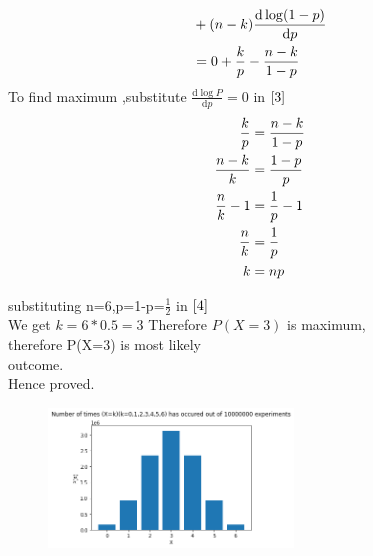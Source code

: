 \documentclass{assignment}
\begin{document}
\begin{paracol}{2}
\begin{large}
\begin{align}
     &+(n-k) \frac{\mathrm{d}\log (1-p)}{\mathrm{d} p} \notag \\
     &=0+\frac{k}{p}-\frac{n-k}{1-p} \label{3}
\end{align}
To find maximum ,substitute $\frac{\mathrm{d} \log P}{\mathrm{d} p}=0$ in $\eqref{3}$
\begin{align}
\frac{k}{p}&=\frac{n-k}{1-p} \notag \\
\frac{n-k}{k}&=\frac{1-p}{p} \notag \\
\frac{n}{k}-1&=\frac{1}{p}-1 \notag \\
\frac{n}{k}&=\frac{1}{p} \notag \\
k&=np \label{4}
\end{align}
\end{large}
\begin{Large}
\switchcolumn[0]
substituting n=6,p=1-p=$\frac{1}{2}$ in $\eqref{4}$\\
We get $k=6*0.5=3$
Therefore $P(X=3)$ is maximum,\\
therefore P(X=3) is most likely \\
outcome.\\
Hence proved.
\switchcolumn[1]
\begin{figure}
\begin{center}
\includegraphics[width=0.58\textwidth]{assignment1.png}
\end{center}
\end{figure}
\end{Large}



\end{paracol}
\end{document}
